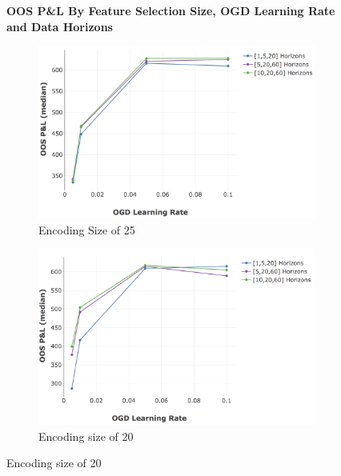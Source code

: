 \documentclass[a4paper,11pt,oneside]{article}
\theoremstyle{plain}
\theoremstyle{definition}
\begin{document}
		\newpage
		\begin{figure}[H]
			\centering
			\textbf{OOS P\&L By Feature Selection Size, OGD Learning Rate and Data Horizons}
			\begin{subfigure}{0.48\linewidth}
				\centering\includegraphics[scale=0.33]{images/results/8_2_determinants/OOS_OGDLR_Delta_Encoding_25_median.png}
				\caption{Encoding Size of 25}
			\end{subfigure}
			\begin{subfigure}{0.49\linewidth}
				\centering\includegraphics[scale=0.33]{images/results/8_2_determinants/OOS_OGDLR_Delta_Encoding_20_median.png}
				\caption{Encoding size of 20}
			\end{subfigure}%
			

\end{figure}
\end{document}
